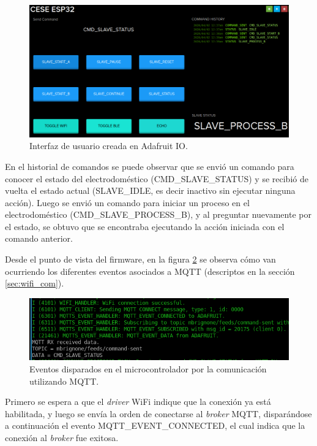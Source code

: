 \begin{figure}[h]
\centering
\includegraphics[width=\textwidth]{./Figures/adafruit_dashboard.png}
\caption{Interfaz de usuario creada en Adafruit IO.}
\label{fig:adafruit_dashboard}
\end{figure}

En el historial de comandos se puede observar que se envió un comando para conocer el estado del electrodoméstico (CMD\_SLAVE\_STATUS) y se recibió de vuelta el estado actual (SLAVE\_IDLE, es decir inactivo sin ejecutar ninguna acción). Luego se envió un comando para iniciar un proceso en el electrodoméstico (CMD\_SLAVE\_PROCESS\_B), y al preguntar nuevamente por el estado, se obtuvo que se encontraba ejecutando la acción iniciada con el comando anterior.

Desde el punto de vista del firmware, en la figura \ref{fig:output_mqtt_connection} se observa cómo van ocurriendo los diferentes eventos asociados a MQTT (descriptos en la sección \ref{sec:wifi_com}). 

\begin{figure}[h]
\centering
\includegraphics[width=\textwidth]{./Figures/output_mqtt_connection.png}
\caption{Eventos disparados en el microcontrolador por la comunicación utilizando MQTT.}
\label{fig:output_mqtt_connection}
\end{figure}

Primero se espera a que el \emph{driver} WiFi indique que la conexión ya está habilitada, y luego se envía la orden de conectarse al \emph{broker} MQTT, disparándose a continuación el evento MQTT\_EVENT\_CONNECTED, el cual indica que la conexión al \emph{broker} fue exitosa. 

